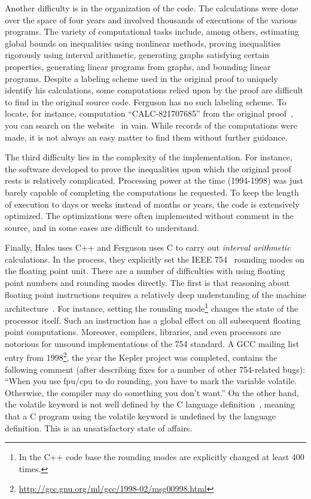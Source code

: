 \documentclass[11pt]{amsart}
\begin{document}
Another difficulty is in the organization of the code. The
calculations were done over the space of four years and involved %
thousands of executions of the various programs. The variety of
computational tasks include, among others, estimating global bounds on
inequalities using nonlinear methods, proving inequalities rigorously
using interval arithmetic, generating graphs satisfying certain
properties, generating linear programs from graphs, and bounding
linear programs. Despite a labeling scheme used in the original proof 
to uniquely
identify his calculations, some computations relied upon by the proof
are difficult to find in the original source code. 
Ferguson has no such labeling scheme.  To locate, for
instance, computation ``CALC-821707685'' from the original proof~\cite[p.159]{Hales:2006:DCG}, you can search on the website~\cite{website:Hales:1998:Code} in
vain.  While records
of the computations were made, it is not always an easy matter
to find them without further guidance.

The third difficulty lies in the complexity of the implementation. For instance,
the software  developed to prove the inequalities upon which the original
proof rests is relatively complicated. Processing power at the time
(1994-1998) was just barely capable of completing the computations he
requested. To keep the length of execution to days or weeks instead of
months or years, the code is extensively optimized. The
optimizations were often implemented without comment in the source,
and in some cases are difficult to understand.  

Finally, Hales uses C++ and Ferguson uses C to carry out
\emph{interval arithmetic} calculations. In the process, they
explicitly set the IEEE 754~\cite{IEEE:1985:IEE754} rounding modes on
the floating point unit. There are a number of difficulties with using
floating point numbers and rounding modes directly. The first is that
reasoning about floating point instructions requires a relatively deep
understanding of the machine architecture~\cite{Monniaux:2008:TOPLAS}.
For instance, setting the rounding mode\footnote{In the C++ code
base the rounding modes are explicitly changed at least 400 times.}
changes the state of the processor itself. Such an instruction has a
global effect on all subsequent floating point computations. Moreover,
compilers, libraries, and even processors are notorious for unsound
implementations of the 754 standard. A GCC mailing list entry from
1998\footnote{\url{http://gcc.gnu.org/ml/gcc/1998-02/msg00998.html}},
the year the Kepler project was completed, contains the following
comment (after describing fixes for a number of other 754-related
bugs): ``When you use fpu/cpu to do rounding, you have to mark the
variable volatile. Otherwise, the compiler may do something  you don't
want.'' On the other hand, the volatile keyword is not well defined by
the C language definition~\cite{Kernighan:1988:C}, meaning that a C
program using the volatile keyword is undefined by the
language definition. This is an unsatisfactory state of affairs.
\end{document}
